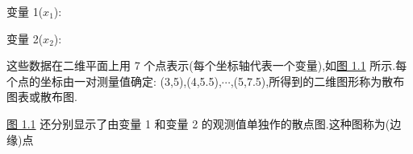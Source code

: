变量 1($x_1$):       

变量 2($x_2$):       

这些数据在二维平面上用 7 个点表示(每个坐标轴代表一个变量),如\hyperref[fig:1.1]{图 1.1} 所示.每个点的坐标由一对测量值确定: (3,5),(4,5.5),$\cdots$,(5,7.5),所得到的二维图形称为散布图表或散布图.

\hyperref[fig:1.1]{图 1.1} 还分别显示了由变量 1 和变量 2 的观测值单独作的散点图.这种图称为(边缘)点%

